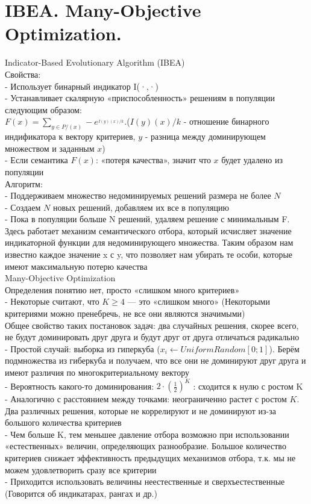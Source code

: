 \section{IBEA. Many-Objective Optimization.}
Indicator-Based Evolutionary Algorithm (IBEA)\\

Свойства:\\
- Использует бинарный индикатор I(·,·)\\
- Устанавливает скалярную «приспособленность» решениям в популяции следующим образом: \\
$F(x) = \sum_{y∈P/(x)} −e^_{I(y)(x)/k}$.($I(y)(x)/k$ - отношение бинарного индификатора к вектору критериев, $y$ - разница между доминирующем множеством и заданным $x$)\\
- Если семантика $F(x)$: «потеря качества», значит что $x$ будет удалено из популяции\\

Алгоритм:\\
- Поддерживаем множество недоминируемых решений размера не более $N$\\
- Создаем $N$ новых решений, добавляем их все в популяцию\\
- Пока в популяции больше N решений, удаляем решение с минимальным F.\\

Здесь работает механизм семантического отбора, который исчисляет значение индикаторной функции для недоминирующего множества. Таким образом нам известно каждое значение x с y, что позволяет нам убирать те особи, которые имеют максимальную потерю качества\\

Many-Objective Optimization\\
Определения понятию нет, просто «слишком много критериев»\\
- Некоторые считают, что $K ≥ 4$ — это «слишком много» (Некоторыми критериями можно пренебречь, не все они являются значимыми)\\
Общее свойство таких постановок задач: два случайных решения, скорее
всего, не будут доминировать друг друга и будут друг от друга отличаться радикально\\
- Простой случай: выборка из гиперкуба ($x_{i} ← UniformRandom[0; 1]$). Берём подмножества из гиберкуба и получаем, что все они не доминируют друг друга и имеют различия по многокритериальному вектору\\
- Вероятность какого-то доминирования: $2 · (\frac{1}{2})^K$ : сходится к нулю с ростом K\\
- Аналогично с расстоянием между точками: неограниченно растет с ростом $K$. Два различных решения, которые не коррелируют и не доминируют из-за большого количества критериев\\
- Чем больше K, тем меньшее давление отбора возможно при использовании «естественных» величин, определяющих разнообразие. Большое количество критериев снижает эффективность предыдущих механизмов отбора, т.к. мы не можем удовлетворить сразу все критерии  \\
- Приходится использовать величины неестественные и сверхъестественные (Говорится об индикатарах, рангах и др.) 
